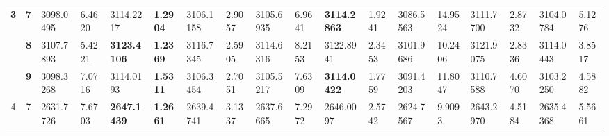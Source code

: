 \documentclass[conference]{IEEEtran}
\begin{document}
\begin{table*}[]
\begin{tabular}{|cc|ll|ll|ll|ll|ll|ll|ll|ll|}
		\multicolumn{1}{|c|}{\multirow{3}{*}{\textbf{3}}} & \textbf{7}                      & \multicolumn{1}{l|}{3098.0495}         & 6.4620                            & \multicolumn{1}{l|}{3114.2217}          & \textbf{1.2904}                   & \multicolumn{1}{l|}{3106.1158}         & 2.9057                            & \multicolumn{1}{l|}{3105.6935}         & 6.9641                            & \multicolumn{1}{l|}{\textbf{3114.2863}} & 1.9241                            & \multicolumn{1}{l|}{3086.5563}         & 14.9524                           & \multicolumn{1}{l|}{3111.7700}         & 2.8732                            & \multicolumn{1}{l|}{3104.0784}         & 5.1276                            \\ \cline{2-18} 
		\multicolumn{1}{|c|}{}                            & \textbf{8}                      & \multicolumn{1}{l|}{3107.7893}         & 5.4221                            & \multicolumn{1}{l|}{\textbf{3123.4106}} & \textbf{1.2369}                   & \multicolumn{1}{l|}{3116.7345}         & 2.5905                            & \multicolumn{1}{l|}{3114.6316}         & 8.2153                            & \multicolumn{1}{l|}{3122.8941}          & 2.3453                            & \multicolumn{1}{l|}{3101.9686}         & 10.2406                           & \multicolumn{1}{l|}{3121.9075}         & 2.8336                            & \multicolumn{1}{l|}{3114.0443}         & 3.8517                            \\ \cline{2-18} 
		\multicolumn{1}{|c|}{}                            & \textbf{9}                      & \multicolumn{1}{l|}{3098.3268}         & 7.0716                            & \multicolumn{1}{l|}{3114.0193}          & \textbf{1.5311}                   & \multicolumn{1}{l|}{3106.3454}         & 2.7051                            & \multicolumn{1}{l|}{3105.5217}         & 7.6309                            & \multicolumn{1}{l|}{\textbf{3114.0422}} & 1.7759                            & \multicolumn{1}{l|}{3091.4203}         & 11.8047                           & \multicolumn{1}{l|}{3110.7588}         & 4.6070                            & \multicolumn{1}{l|}{3103.2250}         & 4.5882                            \\ \hline
		\multicolumn{1}{|c|}{\multirow{3}{*}{4}}          & 7                               & \multicolumn{1}{l|}{2631.7726}         & 7.6703                            & \multicolumn{1}{l|}{\textbf{2647.1439}} & \textbf{1.2661}                   & \multicolumn{1}{l|}{2639.4741}         & 3.1337                            & \multicolumn{1}{l|}{2637.6665}         & 7.2972                            & \multicolumn{1}{l|}{2646.0097}          & 2.5742                            & \multicolumn{1}{l|}{2624.7567}         & 9.9093                            & \multicolumn{1}{l|}{2643.2970}         & 4.5184                            & \multicolumn{1}{l|}{2635.4368}         & 5.5661                            \\ \cline{2-18} 

\end{tabular}
\end{table*}
\end{document}
